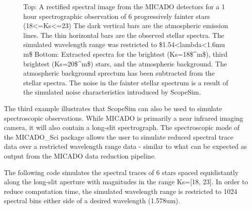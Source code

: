 \begin{figure}
\noindent{}\label{fig-example-3-spectra}

\caption{Top: A rectified spectral image from the MICADO detectors for a 1 hour spectrographic observation of 6 progressively fainter stars (18<=Ks<=23)
The dark vertical bars are the atmospheric emission lines.
The thin horizontal bars are the observed stellar spectra.
The simulated wavelength range was restricted to \$1.54<lambda<1.6mu m\$
Bottom: Extracted spectra for the brightest (Ks=18\$\textasciicircum{}m\$), third brightest (Ks=20\$\textasciicircum{}m\$) stars, and the atmospheric background.
The atmospheric background sprectum has been subtracted from the stellar spectra.
The noise in the fainter stellar spectrum is a result of the simulated noise characteristics introduced by ScopeSim.}
\end{figure}

The third example illustrates that ScopeSim can also be used to simulate spectroscopic observations.
While MICADO is primarily a near infrared imaging camera, it will also contain a long-slit spectrograph.
The spectroscopic mode of the MICADO\_Sci package allows the user to simulate reduced spectral trace data over a restricted wavelength range data - similar to what can be expected as output from the MICADO data reduction pipeline.

The following code simulates the spectral traces of 6 stars spaced equidistantly along the long-slit aperture with magnitudes in the range Ks={[}18, 23{]}.
In order to reduce computation time, the simulated wavelength range is restricted to 1024 spectral bins either side of a desired wavelength (1.578um).

